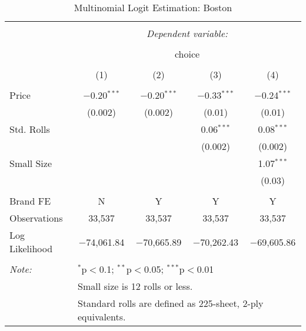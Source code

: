 
\begin{table}[!htbp] \centering 
  \caption{Multinomial Logit Estimation: Boston} 
  \label{tab:mnlBostonBaseline} 
\begin{tabular}{@{\extracolsep{5pt}}lcccc} 
\\[-1.8ex]\hline 
\hline \\[-1.8ex] 
 & \multicolumn{4}{c}{\textit{Dependent variable:}} \\ 
\cline{2-5} 
\\[-1.8ex] & \multicolumn{4}{c}{choice} \\ 
\\[-1.8ex] & (1) & (2) & (3) & (4)\\ 
\hline \\[-1.8ex] 
 Price & $-$0.20$^{***}$ & $-$0.20$^{***}$ & $-$0.33$^{***}$ & $-$0.24$^{***}$ \\ 
  & (0.002) & (0.002) & (0.01) & (0.01) \\ 
  Std. Rolls &  &  & 0.06$^{***}$ & 0.08$^{***}$ \\ 
  &  &  & (0.002) & (0.002) \\ 
  Small Size &  &  &  & 1.07$^{***}$ \\ 
  &  &  &  & (0.03) \\ 
 \hline \\[-1.8ex] 
Brand FE & N & Y & Y & Y \\ 
Observations & 33,537 & 33,537 & 33,537 & 33,537 \\ 
Log Likelihood & $-$74,061.84 & $-$70,665.89 & $-$70,262.43 & $-$69,605.86 \\ 
\hline 
\hline \\[-1.8ex] 
\textit{Note:}  & \multicolumn{4}{l}{$^{*}$p$<$0.1; $^{**}$p$<$0.05; $^{***}$p$<$0.01} \\ 
 & \multicolumn{4}{l}{Small size is 12 rolls or less.} \\ 
 & \multicolumn{4}{l}{Standard rolls are defined as 225-sheet, 2-ply equivalents.} \\ 
\end{tabular} 
\end{table} 
